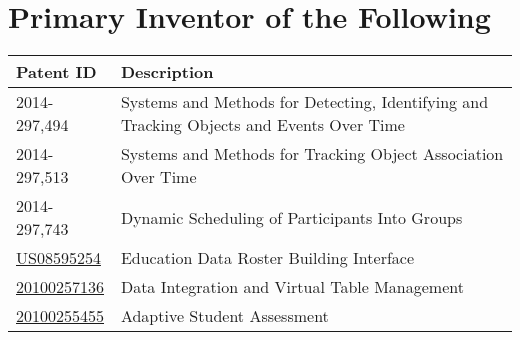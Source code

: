 \section{Primary Inventor of the Following }
\begin{small}
\begin{tabular}{p{2.5cm} p{13.5cm}}
\textbf{Patent ID} & Description\\
\midrule
2014-297,494 & Systems and Methods for Detecting, Identifying and Tracking Objects and Events Over Time \\
2014-297,513 & Systems and Methods for Tracking Object Association Over Time \\
2014-297,743 & Dynamic Scheduling of Participants Into Groups \\
\href{http://www.uspto.gov/web/patents/patog/week48/OG/html/1396-4/US08595254-20131126.html}{US08595254} & Education Data Roster Building Interface \\
\href{http://patents.justia.com/patent/20100257136}{20100257136} & Data Integration and Virtual Table Management \\
\href{http://patents.justia.com/patent/20100255455}{20100255455} & Adaptive Student Assessment \\
\end{tabular}
\end{small}